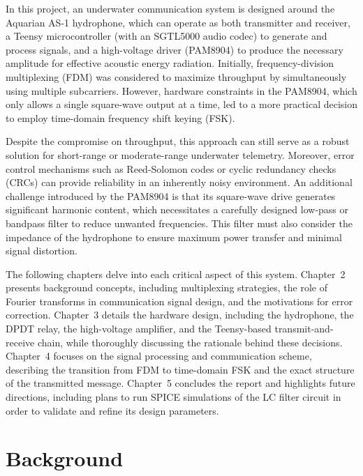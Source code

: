 In this project, an underwater communication system is designed around the Aquarian AS-1 hydrophone, which can operate as both transmitter and receiver, a Teensy microcontroller (with an SGTL5000 audio codec) to generate and process signals, and a high-voltage driver (PAM8904) to produce the necessary amplitude for effective acoustic energy radiation. Initially, frequency-division multiplexing (FDM) was considered to maximize throughput by simultaneously using multiple subcarriers. However, hardware constraints in the PAM8904, which only allows a single square-wave output at a time, led to a more practical decision to employ time-domain frequency shift keying (FSK). 

Despite the compromise on throughput, this approach can still serve as a robust solution for short-range or moderate-range underwater telemetry. Moreover, error control mechanisms such as Reed-Solomon codes or cyclic redundancy checks (CRCs) can provide reliability in an inherently noisy environment. An additional challenge introduced by the PAM8904 is that its square-wave drive generates significant harmonic content, which necessitates a carefully designed low-pass or bandpass filter to reduce unwanted frequencies. This filter must also consider the impedance of the hydrophone to ensure maximum power transfer and minimal signal distortion.

The following chapters delve into each critical aspect of this system. Chapter~2 presents background concepts, including multiplexing strategies, the role of Fourier transforms in communication signal design, and the motivations for error correction. Chapter~3 details the hardware design, including the hydrophone, the DPDT relay, the high-voltage amplifier, and the Teensy-based transmit-and-receive chain, while thoroughly discussing the rationale behind these decisions. Chapter~4 focuses on the signal processing and communication scheme, describing the transition from FDM to time-domain FSK and the exact structure of the transmitted message. Chapter~5 concludes the report and highlights future directions, including plans to run SPICE simulations of the LC filter circuit in order to validate and refine its design parameters.

\chapter{Background}

